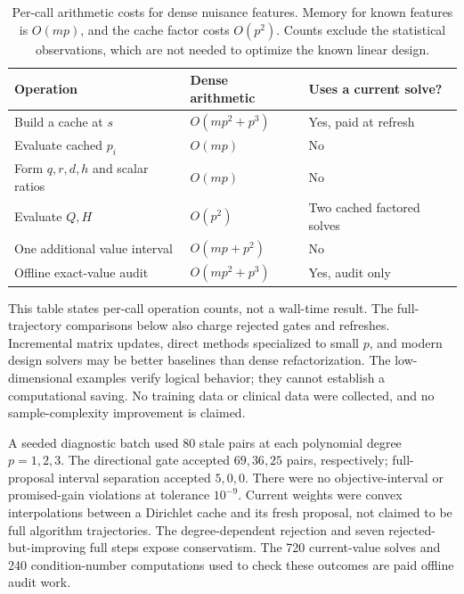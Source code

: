 \documentclass[11pt]{article}
\begin{document}
\begin{table}[t]
\centering\small
\begin{tabular}{p{.38\linewidth}p{.23\linewidth}p{.27\linewidth}}
\toprule
Operation & Dense arithmetic & Uses a current solve?\\\midrule
Build a cache at $s$ & $O(mp^2+p^3)$ & Yes, paid at refresh\\
Evaluate cached $p_i$ & $O(mp)$ & No\\
Form $q,r,d,h$ and scalar ratios & $O(mp)$ & No\\
Evaluate $Q,H$ & $O(p^2)$ & Two cached factored solves\\
One additional value interval & $O(mp+p^2)$ & No\\
Offline exact-value audit & $O(mp^2+p^3)$ & Yes, audit only\\\bottomrule
\end{tabular}
\caption{Per-call arithmetic costs for dense nuisance features. Memory for known features is $O(mp)$, and the cache factor costs $O(p^2)$. Counts exclude the statistical observations, which are not needed to optimize the known linear design.}
\label{tab:cost}
\end{table}
This table states per-call operation counts, not a wall-time result. The full-trajectory comparisons below also charge rejected gates and refreshes.
Incremental matrix updates, direct methods specialized to small $p$, and modern design solvers may be better baselines than dense refactorization.
The low-dimensional examples verify logical behavior; they cannot establish a computational saving.
No training data or clinical data were collected, and no sample-complexity improvement is claimed.

A seeded diagnostic batch used 80 stale pairs at each polynomial degree $p=1,2,3$. The directional gate accepted $69,36,25$ pairs, respectively; full-proposal interval separation accepted $5,0,0$. There were no objective-interval or promised-gain violations at tolerance $10^{-9}$. Current weights were convex interpolations between a Dirichlet cache and its fresh proposal, not claimed to be full algorithm trajectories. The degree-dependent rejection and seven rejected-but-improving full steps expose conservatism. The 720 current-value solves and 240 condition-number computations used to check these outcomes are paid offline audit work.
\end{document}
